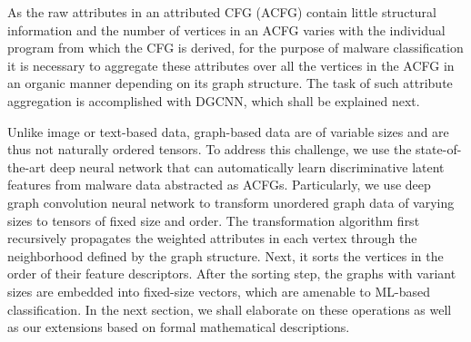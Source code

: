 As the raw attributes in an attributed CFG (ACFG) contain little structural information and the number of vertices in an ACFG varies with the individual program from which the CFG is derived, for the purpose of malware classification it is necessary to aggregate these attributes over all the vertices in the ACFG in an organic manner depending on its graph structure.
The task of such attribute aggregation is accomplished with DGCNN, which shall be explained next.




\label{MG:Subsec:DGCNN}
Unlike image or text-based data, graph-based data are of variable sizes and are thus not naturally ordered tensors.
To address this challenge, we use the state-of-the-art deep neural network that can automatically learn discriminative latent features from malware data abstracted as ACFGs.
Particularly, we use deep graph convolution neural network to transform unordered graph data of varying sizes to tensors of fixed size and order.
The transformation algorithm first recursively propagates the weighted attributes in each vertex through the neighborhood defined by the graph structure.
Next, it sorts the vertices in the order of their feature descriptors.
After the sorting step, the graphs with variant sizes are embedded into fixed-size vectors, which are amenable to ML-based classification.
In the next section, we shall elaborate on these operations as well as our extensions based on formal mathematical descriptions.

